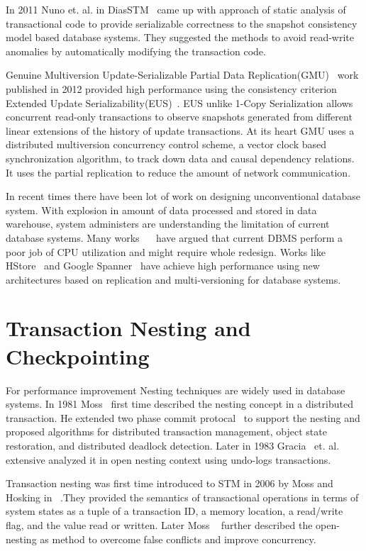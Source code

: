 \documentclass[12pt,english]{report}
\begin{document}
In 2011 Nuno et. al. in DiasSTM~\cite{dias2011efficient} came up with approach of static analysis of transactional code to provide serializable correctness to the snapshot consistency model based database systems. They suggested the methods to avoid read-write anomalies by automatically modifying the transaction code.

Genuine Multiversion Update-Serializable Partial Data Replication(GMU)~\cite{GMU:peluso2012scalability} work published in 2012 provided high performance using the consistency criterion Extended Update Serializability(EUS)~\cite{EUS:HansdahPatnaik}. EUS unlike 1-Copy Serialization allows concurrent read-only transactions to observe snapshots generated from different linear extensions of the history of update transactions. At its heart GMU uses a distributed multiversion concurrency control scheme, a vector clock based synchronization algorithm, to track down data and causal dependency relations. It uses the partial replication to reduce the amount of network communication.

In recent times there have been lot of work on designing unconventional database system. With explosion in amount of data processed and stored in data warehouse, system administers are understanding the limitation of current database systems. Many works ~\cite{Stonebraker:2007:EAE:1325851.1325981}~\cite{harizopoulos2008oltp} have argued that current DBMS perform a poor job of CPU utilization and might require whole redesign. Works like HStore~\cite{HSTORE:kallman2008h} and Google Spanner~\cite{corbett2012spanner} have achieve high performance using new architectures based on replication and multi-versioning for database systems.  

\section{Transaction Nesting and Checkpointing}

For performance improvement Nesting techniques are widely used in database systems. In 1981 Moss~\cite{moss1981nested} first time described the nesting concept in a distributed transaction. He extended two phase commit protocal~\cite{TwoPC:weikum1991principles} to support the nesting and proposed algorithms for distributed transaction management, object state restoration, and distributed deadlock detection. Later in 1983 Gracia~\cite{garcia1983using} et. al. extensive analyzed it in open nesting context using undo-logs transactions. 

Transaction nesting was first time introduced to STM in 2006 by  Moss and Hosking in ~\cite{moss2006nested}.They provided the semantics of transactional operations in terms of
system states as a tuple of a transaction ID, a memory location, a read/write flag, and the value read or written. Later Moss ~\cite{moss2006open} further described the open-nesting as 
method to overcome false conflicts and improve concurrency. 
\end{document}
